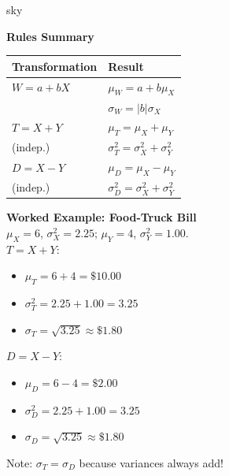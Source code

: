 \documentclass[10pt]{article}
\begin{document}
\begin{skillbox}{sky}
\begin{minipage}[t]{0.48\linewidth}
    \textbf{Rules Summary}
    \renewcommand{\arraystretch}{1.6}
    \begin{tabular}{@{}ll@{}}
    \textbf{Transformation} & \textbf{Result} \\
    \hline
    $W = a + bX$ & $\mu_W = a + b\mu_X$ \\
                 & $\sigma_W = |b|\sigma_X$ \\[4pt]
    $T = X + Y$  & $\mu_T = \mu_X + \mu_Y$ \\
    (indep.)     & $\sigma^2_T = \sigma^2_X + \sigma^2_Y$ \\[4pt]
    $D = X - Y$  & $\mu_D = \mu_X - \mu_Y$ \\
    (indep.)     & $\sigma^2_D = \sigma^2_X + \sigma^2_Y$ \\
    \end{tabular}
\end{minipage}
\hfill
\begin{minipage}[t]{0.48\linewidth}
    \textbf{Worked Example: Food-Truck Bill}\\
    $\mu_X = 6$, $\sigma^2_X = 2.25$; $\mu_Y = 4$, $\sigma^2_Y = 1.00$.\\[4pt]
    $T = X + Y$:
    \begin{itemize}
        \item $\mu_T = 6 + 4 = \$10.00$
        \item $\sigma^2_T = 2.25 + 1.00 = 3.25$
        \item $\sigma_T = \sqrt{3.25} \approx \$1.80$
    \end{itemize}
    $D = X - Y$:
    \begin{itemize}
        \item $\mu_D = 6 - 4 = \$2.00$
        \item $\sigma^2_D = 2.25 + 1.00 = 3.25$
        \item $\sigma_D = \sqrt{3.25} \approx \$1.80$
    \end{itemize}
    Note: $\sigma_T = \sigma_D$ because variances always add!
\end{minipage}
\end{skillbox}
\end{document}
